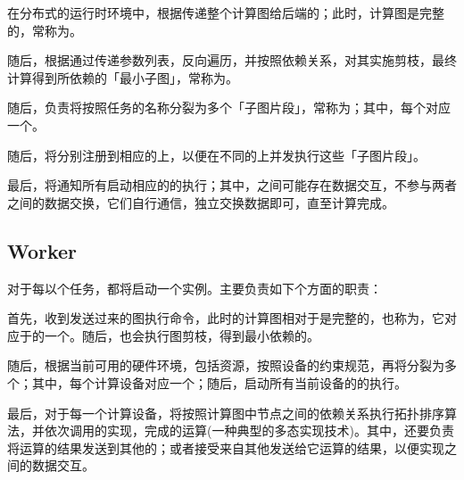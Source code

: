 \begin{content}
在分布式的运行时环境中，根据传递整个计算图给后端的；此时，计算图是完整的，常称为。

随后，根据通过传递参数列表，反向遍历，并按照依赖关系，对其实施剪枝，最终计算得到所依赖的「最小子图」，常称为。

随后，负责将按照任务的名称分裂为多个「子图片段」，常称为；其中，每个对应一个。

随后，将分别注册到相应的上，以便在不同的上并发执行这些「子图片段」。

最后，将通知所有启动相应的的执行；其中，之间可能存在数据交互，不参与两者之间的数据交换，它们自行通信，独立交换数据即可，直至计算完成。

\subsection{Worker}

对于每以个任务，\tf{}都将启动一个实例。主要负责如下个方面的职责：

\begin{enum}
\end{enum}

首先，收到发送过来的图执行命令，此时的计算图相对于是完整的，也称为，它对应于的一个。随后，也会执行图剪枝，得到最小依赖的。

随后，根据当前可用的硬件环境，包括资源，按照设备的约束规范，再将分裂为多个；其中，每个计算设备对应一个；随后，启动所有当前设备的的执行。

最后，对于每一个计算设备，将按照计算图中节点之间的依赖关系执行拓扑排序算法，并依次调用的实现，完成的运算(一种典型的多态实现技术)。其中，还要负责将运算的结果发送到其他的；或者接受来自其他发送给它运算的结果，以便实现之间的数据交互。


\end{content}
